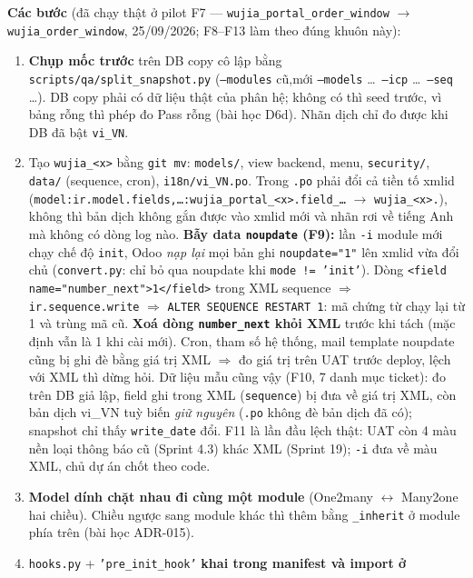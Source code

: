 \textbf{Các bước} (đã chạy thật ở pilot F7 --- \texttt{wujia\_portal\_order\_window} $\rightarrow$
\texttt{wujia\_order\_window}, 25/09/2026; F8--F13 làm theo đúng khuôn này):
\begin{enumerate}
\item \textbf{Chụp mốc trước} trên DB copy cô lập bằng \texttt{scripts/qa/split\_snapshot.py}
  (\texttt{--modules} cũ,mới \texttt{--models} \ldots\ \texttt{--icp} \ldots\ \texttt{--seq} \ldots).
  DB copy phải có dữ liệu thật của phân hệ; không có thì seed trước, vì bảng rỗng thì phép đo
  Pass rỗng (bài học D6d). Nhãn dịch chỉ đo được khi DB đã bật \texttt{vi\_VN}.
\item Tạo \texttt{wujia\_<x>} bằng \texttt{git mv}: \texttt{models/}, view backend, menu,
  \texttt{security/}, \texttt{data/} (sequence, cron), \texttt{i18n/vi\_VN.po}. Trong
  \texttt{.po} phải đổi cả tiền tố xmlid (\texttt{model:ir.model.fields,\ldots:wujia\_portal\_<x>.field\_\ldots}
  $\rightarrow$ \texttt{wujia\_<x>.}), không thì bản dịch không gắn được vào xmlid mới và nhãn
  rơi về tiếng Anh mà không có dòng log nào.
  \textbf{Bẫy data \texttt{noupdate} (F9):} lần \texttt{-i} module mới chạy chế độ \texttt{init}, Odoo
  \emph{nạp lại} mọi bản ghi \texttt{noupdate="1"} lên xmlid vừa đổi chủ (\texttt{convert.py}: chỉ bỏ qua
  noupdate khi \texttt{mode != 'init'}). Dòng \texttt{<field name="number\_next">1</field>} trong XML
  sequence $\Rightarrow$ \texttt{ir.sequence.write} $\Rightarrow$ \texttt{ALTER SEQUENCE RESTART 1}:
  mã chứng từ chạy lại từ 1 và trùng mã cũ. \textbf{Xoá dòng \texttt{number\_next} khỏi XML} trước khi
  tách (mặc định vẫn là 1 khi cài mới). Cron, tham số hệ thống, mail template noupdate cũng bị ghi đè
  bằng giá trị XML $\Rightarrow$ đo giá trị trên UAT trước deploy, lệch với XML thì dừng hỏi.
  Dữ liệu mẫu cũng vậy (F10, 7 danh mục ticket): đo trên DB giả lập, field ghi trong XML
  (\texttt{sequence}) bị đưa về giá trị XML, còn bản dịch vi\_VN tuỳ biến \emph{giữ nguyên} (\texttt{.po}
  không đè bản dịch đã có); snapshot chỉ thấy \texttt{write\_date} đổi.
  F11 là lần đầu lệch thật: UAT còn 4 màu nền loại thông báo cũ (Sprint 4.3) khác XML (Sprint 19);
  \texttt{-i} đưa về màu XML, chủ dự án chốt theo code.
\item \textbf{Model dính chặt nhau đi cùng một module} (One2many $\leftrightarrow$ Many2one hai
  chiều). Chiều ngược sang module khác thì thêm bằng \texttt{\_inherit} ở module phía trên (bài
  học ADR-015).
\item \texttt{hooks.py} + \texttt{'pre\_init\_hook'} \textbf{khai trong manifest và import ở
}
\end{enumerate}
